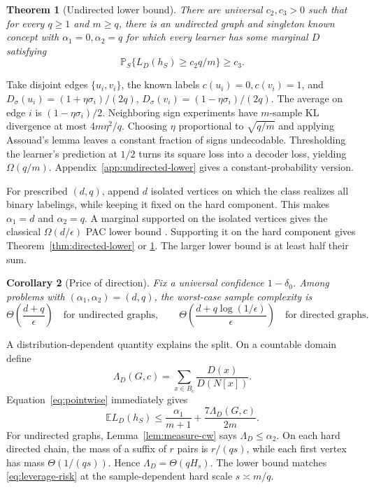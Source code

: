 \documentclass{article}
\newtheorem{theorem}{Theorem}
\newtheorem{corollary}[theorem]{Corollary}
\newcommand{\E}{\mathbb E}
\newcommand{\Pp}{\mathbb P}
\newcommand{\1}{\mathbf 1}
\begin{document}
\begin{theorem}[Undirected lower bound]\label{thm:undirected-lower}
There are universal $c_2,c_3>0$ such that for every $q\ge1$ and $m\ge q$, there is an undirected graph and singleton known concept with $\alpha_1=0,\alpha_2=q$ for which every learner has some marginal $D$ satisfying \[ \Pp_S\{L_D(h_S)\ge c_2q/m\}\ge c_3. \]
\end{theorem}

Take disjoint edges $\{u_i,v_i\}$, the known labels $c(u_i)=0,c(v_i)=1$, and $D_\sigma(u_i)=(1+\eta\sigma_i)/(2q)$, $D_\sigma(v_i)=(1-\eta\sigma_i)/(2q)$. The average on edge $i$ is $(1-\eta\sigma_i)/2$. Neighboring sign experiments have $m$-sample KL divergence at most $4m\eta^2/q$. Choosing $\eta$ proportional to $\sqrt{q/m}$ and applying Assouad's lemma leaves a constant fraction of signs undecodable. Thresholding the learner's prediction at $1/2$ turns its square loss into a decoder loss, yielding $\Omega(q/m)$. Appendix~\ref{app:undirected-lower} gives a constant-probability version.

For prescribed $(d,q)$, append $d$ isolated vertices on which the class realizes all binary labelings, while keeping it fixed on the hard component. This makes $\alpha_1=d$ and $\alpha_2=q$. A marginal supported on the isolated vertices gives the classical $\Omega(d/\epsilon)$ PAC lower bound \citep{ehrenfeucht1989}. Supporting it on the hard component gives Theorem~\ref{thm:directed-lower} or \ref{thm:undirected-lower}. The larger lower bound is at least half their sum.

\begin{corollary}[Price of direction]\label{cor:envelope}
Fix a universal confidence $1-\delta_0$. Among problems with $(\alpha_1,\alpha_2)=(d,q)$, the worst-case sample complexity is \[ \Theta\!\left(\frac{d+q}{\epsilon}\right) \quad\text{for undirected graphs},\qquad \Theta\!\left(\frac{d+q\log(1/\epsilon)}{\epsilon}\right) \quad\text{for directed graphs}. \]
\end{corollary}

A distribution-dependent quantity explains the split. On a countable domain define
\begin{equation}
 \Lambda_D(G,c)=\sum_{x\in B_c}\frac{D(x)}{D(N[x])}.
 \label{eq:leverage}
\end{equation}
Equation~\eqref{eq:pointwise} immediately gives
\begin{equation}
 \E L_D(h_S)\le\frac{\alpha_1}{m+1}+\frac{7\Lambda_D(G,c)}{2m}.
 \label{eq:leverage-risk}
\end{equation}
For undirected graphs, Lemma~\ref{lem:measure-cw} says $\Lambda_D\le\alpha_2$. On each hard directed chain, the mass of a suffix of $r$ pairs is $r/(qs)$, while each first vertex has mass $\Theta(1/(qs))$. Hence $\Lambda_D=\Theta(qH_s)$. The lower bound matches \eqref{eq:leverage-risk} at the sample-dependent hard scale $s\asymp m/q$.
\end{document}
